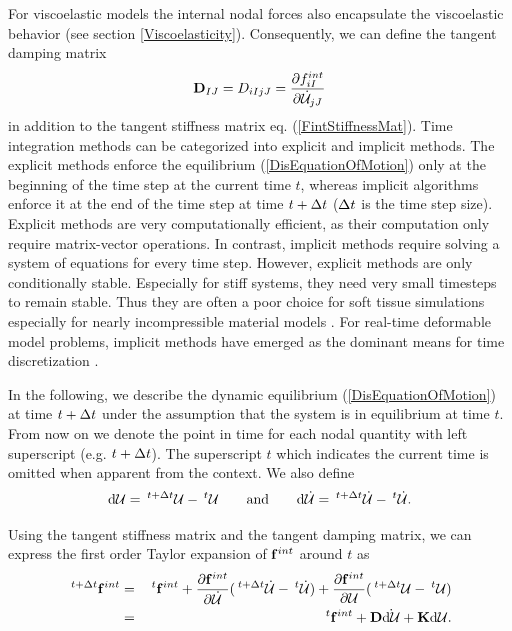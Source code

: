 For viscoelastic models the internal nodal forces also encapsulate the viscoelastic behavior (see section \ref{Viscoelasticity}). Consequently, we can define the tangent damping matrix
\begin{eqnarray}
\mathbf D _{IJ} = D _{iIjJ} = \frac{\partial f ^{int}_{iI} }{\partial \dot{\mathcal{U} }_{jJ}}
\label{DampingMat}
\end{eqnarray}
in addition to the tangent stiffness matrix eq. (\ref{FintStiffnessMat}). Time integration methods can be categorized into explicit and implicit methods. The explicit methods enforce the equilibrium (\ref{DisEquationOfMotion}) only at the beginning of the time step at the current time $t$, whereas implicit algorithms enforce it at the end of the time step at time $t+\Delta t $ ($\Delta t $ is the time step size). Explicit methods are very computationally efficient, as their computation only require matrix-vector operations. In contrast, implicit methods require solving a system of equations for every time step. However, explicit methods are only conditionally stable. Especially for stiff systems, they need very small timesteps to remain stable. Thus they are often a poor choice for soft tissue simulations especially for nearly incompressible material models \cite{Sueli2003}. For real-time deformable model problems, implicit methods have emerged as the dominant means for time discretization \cite{Baraff1998}.

In the following, we describe the dynamic equilibrium (\ref{DisEquationOfMotion}) at time $t+\Delta t $ under the assumption that the system is in equilibrium at time $t$. From now on we denote the point in time for each nodal quantity with left superscript (e.g. $t+\Delta t $). The superscript $t$ which indicates the current time is omitted when apparent from the context. We also define
\begin{equation}
\mcdu = \mtvh \mcu - \mth \mcu   \qquad \textnormal{and} \qquad \mcdv = \mtvh \mcv - \mth \mcv.
\end{equation}

Using the tangent stiffness matrix and the tangent damping matrix, we can express the first order Taylor expansion of $\mathbf f ^{int}$ around $t$ as
\begin{eqnarray}
\mtvh \mfint &=& \mth \mfint + \frac{\partial \mfint}{\partial {\mcv}} (\mtvh \mcv - \mth \mcv) + \frac{\partial \mfint}{\partial {\mcu}} (\mtvh \mcu - \mth \mcu) \\
&=& \mth \mfint + \mdmat \dot{\mcdu} + \msmat \mcdu.
\end{eqnarray}


